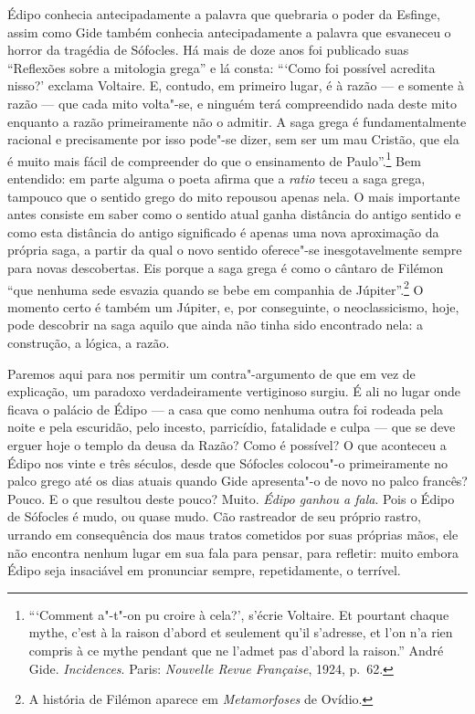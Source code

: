 Édipo conhecia antecipadamente a palavra que quebraria o poder da Esfinge,
assim como Gide também conhecia antecipadamente a palavra que
esvaneceu o horror da tragédia de Sófocles. Há mais de
doze anos foi publicado suas ``Reflexões sobre a mitologia grega'' e lá
consta: ```Como foi possível acredita nisso?' exclama Voltaire. E,
contudo, em primeiro lugar, é à razão --- e somente à razão --- que cada mito
volta"-se, e ninguém terá compreendido nada deste mito enquanto a razão primeiramente não
o admitir. A saga grega é fundamentalmente racional e precisamente por
isso pode"-se dizer, sem ser um mau Cristão, que ela é muito
mais fácil de compreender do que o ensinamento de Paulo''.\footnote{```Comment
  a"-t"-on pu croire à cela?', s'écrie Voltaire. Et pourtant chaque
  mythe, c'est à la raison d'abord et seulement qu'il s'adresse, et l'on
  n'a rien compris à ce mythe pendant que ne l'admet pas d'abord la
  raison.'' André Gide. \emph{Incidences}. Paris: \emph{Nouvelle Revue Française},
  1924, p.~62. \versal{[N.~T.]}} Bem entendido: em parte alguma o poeta afirma que a
\emph{ratio} teceu a saga grega, tampouco que o sentido grego do mito
repousou apenas nela. O mais importante antes consiste em saber como o
sentido atual ganha distância do antigo sentido e como esta distância do antigo
significado é apenas uma nova aproximação da própria saga, a partir da
qual o novo sentido oferece"-se inesgotavelmente sempre para novas
descobertas. Eis porque a saga grega é como o cântaro de Filémon ``que
nenhuma sede esvazia quando se bebe em companhia de Júpiter''.\footnote{A história de Filémon aparece em \emph{Metamorfoses} de Ovídio. \versal{[N.~E.]}} O
momento certo é também um Júpiter, e, por conseguinte, o neoclassicismo,
hoje, pode descobrir na saga aquilo que ainda não tinha sido
encontrado nela: a construção, a lógica, a razão.

Paremos aqui para nos permitir um contra"-argumento de que em vez de explicação,
um paradoxo verdadeiramente vertiginoso surgiu. É ali no lugar onde
ficava o palácio de Édipo --- a casa que como nenhuma outra foi rodeada
pela noite e pela escuridão, pelo incesto, parricídio, fatalidade e
culpa --- que se deve erguer hoje o templo da deusa da Razão? Como é
possível? O que aconteceu a Édipo nos vinte e três séculos, desde que
Sófocles colocou"-o primeiramente no palco grego até os dias atuais
quando Gide apresenta"-o de novo no palco francês? Pouco. E o que
resultou deste pouco? Muito. \emph{Édipo ganhou a fala}. Pois o Édipo de
Sófocles é mudo, ou quase mudo. Cão rastreador de seu próprio rastro,
urrando em consequência dos maus tratos cometidos por suas próprias
mãos, ele não encontra nenhum lugar em sua fala para pensar, para refletir: muito
embora Édipo seja insaciável em pronunciar sempre, repetidamente, o
terrível.

